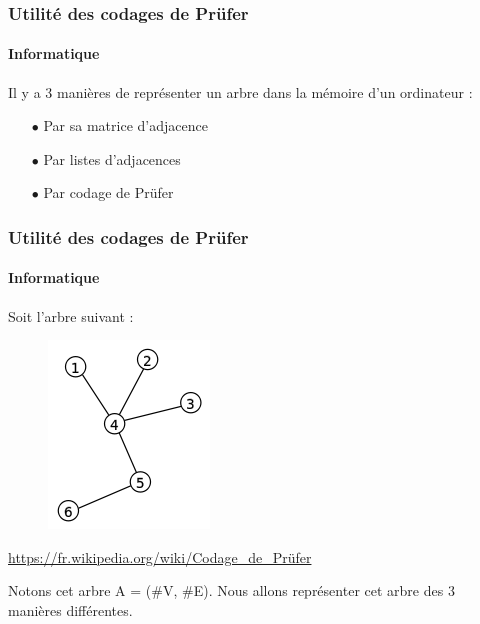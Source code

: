 \documentclass[11pt]{beamer}
\begin{document}
\begin{frame}
\frametitle{Utilité des codages de Prüfer}
\framesubtitle{Informatique}

Il y a 3 manières de représenter un arbre dans la mémoire d'un ordinateur :\\

\begin{enumerate}
\item[$\bullet$]Par sa matrice d'adjacence
\item[$\bullet$]Par listes d'adjacences
\item[$\bullet$]Par codage de Prüfer
\end{enumerate}
\end{frame}

\begin{frame}
\frametitle{Utilité des codages de Prüfer}
\framesubtitle{Informatique}

Soit l'arbre suivant :\\
\begin{figure}[!ht] \center
\includegraphics[scale=0.40]{exempleArbre.png}
\end{figure}
\begin{center}
\tiny{\url{https://fr.wikipedia.org/wiki/Codage_de_Prüfer}}
\end{center}

Notons cet arbre A = ($\#$V, $\#$E).
Nous allons représenter cet arbre des 3 manières différentes.
\end{frame}
\end{document}
